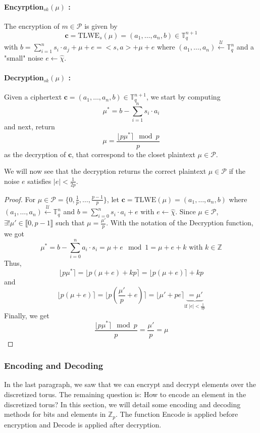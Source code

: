\documentclass{article}
\newcommand{\Z}{\mathbb{Z}}
\newcommand{\T}{\mathbb{T}}
\newcommand{\Pcal}{\mathcal{P}}
\newcommand{\Sunif}{\xleftarrow{\mathcal{U}}}
\newcommand{\ChiChap}{\hat{\chi}}
\newcommand{\round}[1]{\lfloor#1\rceil}
\theoremstyle{definition}
\theoremstyle{Theorem}
\begin{document}
\paragraph{Encyrption$_{sk}(\mu)$ :}
The encryption of $m\in\mathcal{P}$ is given by 
$$\mathbf{c} = \text{TLWE}_s(\mu)=(a_1,\ldots,a_n,b)\in\T_q^{n+1}$$
with $b = \sum_{i=1}^n s_i\cdot a_j + \mu + e =<s,a> + \mu + e$ where $(a_1,\ldots,a_n)\Sunif\T_q^n$ and a "small" noise $e\leftarrow\ChiChap$.

\paragraph{Decryption$_{sk}(\mu)$ :}
Given a ciphertext $\mathbf{c} = (a_1,\ldots,a_n,b)\in\T_q^{n+1}$, we start by computing
$$\mu^* = b - \sum_{i=1}^n s_i \cdot a_i$$
and next, return 
$$\mu = \frac{\round{p\mu^*}\mod p}{p}$$
as the decryption of $\mathbf{c}$, that correspond to the closet plaintext $\mu\in\mathcal{P}$.

We will now see that the decryption returns the correct plaintext $\mu\in\mathcal{P}$ if the noise $e$ satisfies $|e| < \frac{1}{2p}$.

\begin{proof}
For $\mu\in\Pcal=\{0,\frac{1}{p},\ldots,\frac{p-1}{p}\}$, let $\mathbf{c}=\text{TLWE}(\mu)=(a_1,\ldots,a_n,b)$ where $(a_1,\ldots,a_n) \Sunif\T_q^n$ and $b=\sum_{i=0}^n s_i \cdot a_i + e$ with $e\leftarrow\ChiChap$. Since $\mu\in\Pcal$, $\exists!\mu'\in \llbracket0,p-1\rrbracket$ such that $\mu=\frac{\mu'}{p}$. With the notation of the Decryption function, we got 
$$\mu^* = b - \sum_{i=0}^n a_i\cdot s_i = \mu + e \mod 1 = \mu+e+k \text{ with $k\in\Z$}$$
Thus,
$$\round{p\mu^*}=\round{p(\mu+e) + kp} = \round{p(\mu+e)} + kp$$
and 
$$\round{p(\mu+e)}=\round{p(\frac{\mu'}{p}+e)} = \round{\mu'+pe}\underbrace{=\mu'}_{\text{if }|e|<\frac{1}{2p}}$$
Finally, we get
$$\frac{\round{p\mu^*}\mod p}{p} = \frac{\mu'}{p} = \mu$$
\end{proof}

\subsubsection{Encoding and Decoding}
In the last paragraph, we saw that we can encrypt and decrypt elements over the discretized torus. The remaining question is: How to encode an element in the discretized torus? In this section, we will detail some encoding and decoding methods for bits and elements in $\Z_p$. The function Encode is applied before encryption and Decode is applied after decryption.
\end{document}
